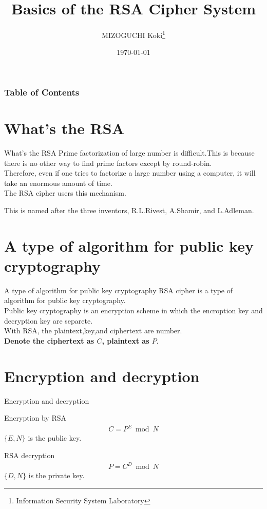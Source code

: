 \documentclass[dvipdfmx]{beamer}
\title[RSA Cipher System]{Basics of the RSA Cipher System}
\author[K.MIZOGUCHI]{MIZOGUCHI Koki\thanks{Information Security System Laboratory}}
\date{\today}
\institute[KUT]{Kochi University of Technology}
\begin{document}
\begin{frame}
\titlepage
\end{frame}

\begin{frame}
\frametitle{Table of Contents}
\tableofcontents
\end{frame}

\section*{What's the RSA}
\begin{frame}{What's the RSA}
    Prime factorization of large number is difficult.This is because there is no other way to find prime factors except by round-robin.\\
    Therefore, even if one tries to factorize a large number using a computer, it will take an enormous amount of time.\\
    The RSA cipher users this mechanism.
    \begin{block}{}
        This is named after the three inventors, R.L.Rivest, A.Shamir, and L.Adleman.
    \end{block}
\end{frame}
\section*{A type of algorithm for public key cryptography}
\begin{frame}{A type of algorithm for public key cryptography}
    RSA cipher is a type of algorithm for public key cryptography.\\
    Public key cryptography is an encryption scheme in which the encroption key and decryption key are separete.\\
    With RSA, the plaintext,key,and ciphertext are number.\\
    \textbf{Denote the ciphertext as $C$, plaintext as $P$}.
\end{frame}
\section*{Encryption and decryption}
\begin{frame}{Encryption and decryption}
    \begin{alertblock}{Encryption by RSA}
        \begin{align}
            C=P^E\bmod N
        \end{align}
        \(\{E,N\}\) is the public key.
    \end{alertblock}
    \begin{alertblock}{RSA decryption}
        \begin{align}
            P=C^D\bmod N
        \end{align}
        \(\{D,N\}\) is the private key.
    \end{alertblock}
\end{frame}
\end{document}
